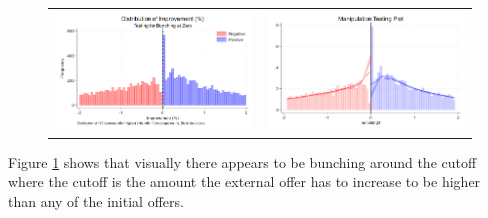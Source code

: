 \documentclass[12pt]{article}
\begin{document}
\begin{figure}[H]
\caption{}
\label{fig:ie7_3}
\centering{}%
\begin{tabular}{cc}
\includegraphics[scale=0.3]{../figures/IE7/IE7_hist_bunching_max(2).png} & \includegraphics[scale=0.3]{../figures/IE7/IE7_rd_bunching_max(2).png}
\end{tabular}
\end{figure}

Figure \ref{fig:ie7_3} shows that visually there appears to be bunching around the cutoff where the cutoff is the amount the external offer has to increase to be higher than any of the initial offers. 
\end{document}
